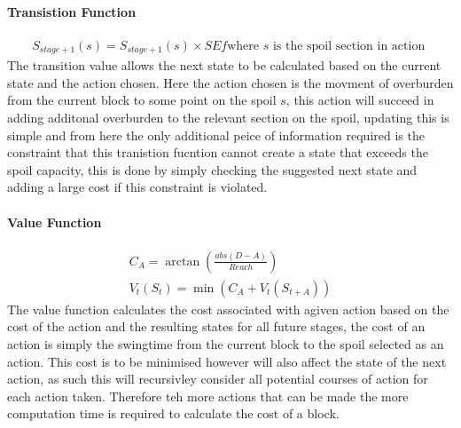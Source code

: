 \paragraph*{Transistion Function}
\begin{align}
\label{Transition}
S_{stage+1}(s)=S_{stage+1}(s)\times SEf  \text{where $s$ is the spoil section in action }
\end{align}
The transition value allows the next state to be calculated based on the current state and the action chosen. Here the action chosen is the movment of overburden from the current block to some point on the spoil $s$, this action will succeed in adding additonal overburden to the relevant section on the spoil, updating this is simple and from here the only additional peice of information required is the constraint that this tranistion fucntion cannot create a state that exceeds the spoil capacity, this is done by simply checking the suggested next state and adding a large cost if this constraint is violated. 
\paragraph*{Value Function}
\begin{align}
\label{value}
C_A = \arctan(\frac{abs(D-A)}{Reach})\\
V_t(S_t) = \min (C_A+V_t(S_{t+A}))
\end{align}
The value function calculates the cost associated with agiven action based on the cost of the action and the resulting states for all future stages, the cost of an action is simply the swingtime from the current block to the spoil selected as an action. This cost is to be minimised however will also affect the state of the next action, as such this will recursivley consider all potential courses of action for each action taken. Therefore teh more actions that can be made the more computation time is required to calculate the cost of a block. 
